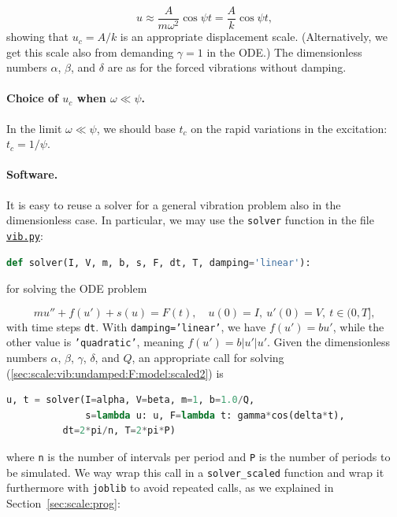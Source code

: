 \documentclass[graybox,envcountchap,sectrefs,final]{svmonodo}
\begin{document}
\[ u \approx \frac{A}{m\omega^2}\cos\psi t = \frac{A}{k}\cos\psi t,\]
showing that $u_c=A/k$ is an appropriate displacement scale.
(Alternatively, we get this scale also from demanding $\gamma=1$ in the ODE.)
The dimensionless numbers $\alpha$, $\beta$, and $\delta$ are as
for the forced vibrations without damping.

\paragraph{Choice of $u_c$ when $\omega\ll\psi$.}
In the limit $\omega\ll\psi$, we should base $t_c$ on the rapid
variations in the excitation: $t_c=1/\psi$.

\paragraph{Software.}
It is easy to reuse a solver for a general vibration problem also
in the dimensionless case.
In particular, we may use the \texttt{solver} function in the
file \href{{http://tinyurl.com/o8pb3yy/vib.py}}{\nolinkurl{vib.py}}:

\begin{lstlisting}[language=Python,style=graycolor]
def solver(I, V, m, b, s, F, dt, T, damping='linear'):
\end{lstlisting}
for solving the ODE problem

\[ mu'' + f(u') + s(u) = F(t),\quad u(0)=I,\ u'(0)=V,\ t\in (0,T],\]
with time steps \texttt{dt}. With \texttt{damping='linear'}, we have $f(u')=bu'$, while the
other value is \texttt{'quadratic'}, meaning $f(u')=b|u'|u'$.
Given the dimensionless numbers $\alpha$, $\beta$, $\gamma$, $\delta$,
and $Q$,
an appropriate call for solving (\ref{sec:scale:vib:undamped:F:model:scaled2}) is

\begin{lstlisting}[language=Python,style=graycolor]
u, t = solver(I=alpha, V=beta, m=1, b=1.0/Q,
              s=lambda u: u, F=lambda t: gamma*cos(delta*t),
	      dt=2*pi/n, T=2*pi*P)
\end{lstlisting}
where \texttt{n} is the number of intervals per period and \texttt{P} is the number
of periods to be simulated.
We way wrap this call in a \Verb!solver_scaled! function and wrap it furthermore
with \texttt{joblib} to avoid repeated calls,
as we explained in
Section~\ref{sec:scale:prog}:
\end{document}
